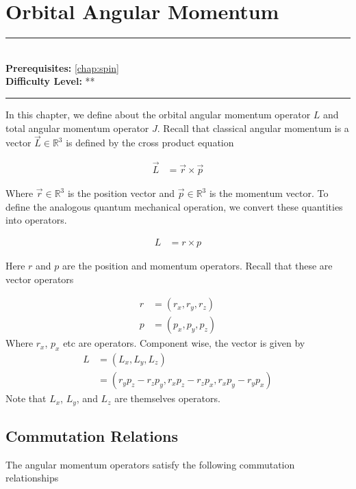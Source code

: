 \documentclass[book.tex]{subfiles}
\begin{document}
\chapter{Orbital Angular Momentum}

\label{chap:orbital_angular_momentum}
\noindent\rule{11cm}{0.4pt} \\
\textbf{Prerequisites:} \autoref{chap:spin} \\
\textbf{Difficulty Level:} ** \\
\noindent\rule{11cm}{0.4pt}
\vspace{5mm}

In this chapter, we define about the orbital angular momentum operator $L$ and total angular momentum operator $J$. Recall that classical angular momentum is a vector $\vec{L} \in \mathbb{R}^3$ is defined by the cross product equation

\begin{align}
    \vec{L} &= \vec{r} \times \vec{p}
\end{align}

Where $\vec{r} \in \mathbb{R}^3$ is the position vector and $\vec{p} \in \mathbb{R}^3$ is the momentum vector. To define the analogous quantum mechanical operation, we convert these quantities into operators.

\begin{align}
    L &= r \times p
\end{align}

Here $r$ and $p$ are the position and momentum operators. Recall that these are vector operators

\begin{align}
    r &= (r_x, r_y, r_z) \\
    p &= (p_x, p_y, p_z)
\end{align}
Where $r_x$, $p_x$ etc are operators. Component wise, the vector is given by
\begin{align}
    L &= (L_x, L_y, L_z) \\
    &= (r_y p_z - r_z p_y, r_x p_z - r_z p_x, r_x p_y - r_y p_x)
\end{align}
Note that $L_x$, $L_y$, and $L_z$ are themselves operators.

\section{Commutation Relations}

The angular momentum operators satisfy the following commutation relationships
\end{document}
